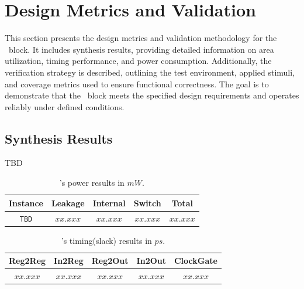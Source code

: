 
\section{Design Metrics and Validation}
\label{design_metrics_and_validation}

This section presents the design metrics and validation methodology for the \blockname\ block. It includes synthesis results, providing detailed information on area utilization, timing performance, and power consumption. Additionally, the verification strategy is described, outlining the test environment, applied stimuli, and coverage metrics used to ensure functional correctness. The goal is to demonstrate that the \blockname\ block meets the specified design requirements and operates reliably under defined conditions.

\subsection{Synthesis Results}

TBD

\begin{table}[h]	
    \centering
    \begin{tabular}{|c|c|c|c|c|}
		\arrayrulecolor{sandnavy!50}\hline
		\rowcolor{sandnavy!50}\hline
        \textcolor{sandwhite}{Instance} &
        \textcolor{sandwhite}{Leakage}  &
        \textcolor{sandwhite}{Internal} &
        \textcolor{sandwhite}{Switch}   &
        \textcolor{sandwhite}{Total}    \\ \hline
        \texttt{TBD} & $xx.xxx$ & $xx.xxx$ & $xx.xxx$ & $xx.xxx$ \\ \hline
	\end{tabular}
    \caption{\blockname's power results in $mW$.}
    \label{tab:power}
\end{table}

\begin{table}[h]	
    \centering
    \begin{tabular}{|c|c|c|c|c|}
		\arrayrulecolor{sandnavy!50}\hline
		\rowcolor{sandnavy!50}\hline
        \textcolor{sandwhite}{Reg2Reg} &
        \textcolor{sandwhite}{In2Reg}  &
        \textcolor{sandwhite}{Reg2Out} &
        \textcolor{sandwhite}{In2Out}  &
        \textcolor{sandwhite}{ClockGate}    \\ \hline
        $xx.xxx$ & $xx.xxx$ & $xx.xxx$ & $xx.xxx$ & $xx.xxx$ \\ \hline
	\end{tabular}
    \caption{\blockname's timing(slack) results in $ps$.}
    \label{tab:performance}
\end{table}


